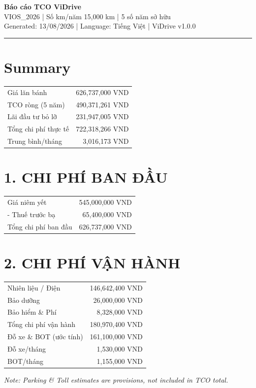 \documentclass[11pt,a4paper]{article}
\begin{document}
\thispagestyle{empty}

\begin{center}
    {\LARGE \textbf{\color{ViDriveBlue} Báo cáo TCO ViDrive}}\\[0.3cm]
    {\Large VIOS\_2026 | Số km/năm 15,000 km | 5 số năm sở hữu}\\[0.2cm]
    {\normalsize Generated: 13/08/2026 | Language: Tiếng Việt | ViDrive v1.0.0}
\end{center}
\vspace{0.5cm}
\hrule
\vspace{0.5cm}
\section*{Summary}
\begin{tabular}{l r}
\toprule
Giá lăn bánh & 626,737,000 VND \\
TCO ròng (5 năm) & 490,371,261 VND \\
Lãi đầu tư bỏ lỡ & 231,947,005 VND \\
Tổng chi phí thực tế & 722,318,266 VND \\
Trung bình/tháng & 3,016,173 VND \\
\bottomrule
\end{tabular}
\vspace{0.3cm}\section*{1. CHI PHÍ BAN ĐẦU}
\begin{tabular}{l r}
\toprule
Giá niêm yết & 545,000,000 VND \\
 - Thuế trước bạ & 65,400,000 VND \\
Tổng chi phí ban đầu & 626,737,000 VND \\
\bottomrule
\end{tabular}
\vspace{0.3cm}\section*{2. CHI PHÍ VẬN HÀNH}
\begin{tabular}{l r}
\toprule
Nhiên liệu / Điện & 146,642,400 VND \\
Bảo dưỡng & 26,000,000 VND \\
Bảo hiểm \& Phí & 8,328,000 VND \\
Tổng chi phí vận hành & 180,970,400 VND \\
Đỗ xe \& BOT (ước tính) & 161,100,000 VND \\
  Đỗ xe/tháng & 1,530,000 VND \\
  BOT/tháng & 1,155,000 VND \\
\bottomrule
\end{tabular}
\vspace{0.3cm}\textit{Note: Parking \& Toll estimates are provisions, not included in TCO total.}
\end{document}
